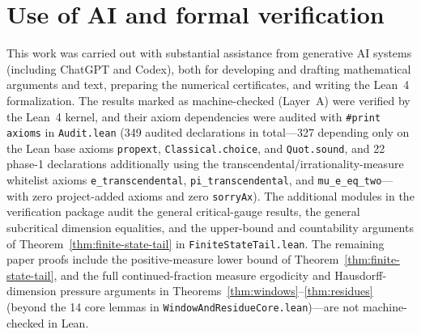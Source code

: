 \documentclass[11pt]{article}
\theoremstyle{definition}
\theoremstyle{remark}
\begin{document}
\section*{Use of AI and formal verification}
This work was carried out with substantial assistance from generative AI
systems (including ChatGPT and Codex), both for developing and drafting
mathematical arguments and text, preparing the numerical certificates, and
writing the Lean~4 formalization. The results marked as machine-checked (Layer~A)
were verified by the Lean~4 kernel, and their axiom dependencies were audited
with \texttt{\#print axioms} in \texttt{Audit.lean} (349 audited declarations
in total---327 depending only on the Lean base axioms \texttt{propext},
\texttt{Classical.choice}, and \texttt{Quot.sound}, and 22 phase-1 declarations
additionally using the transcendental/irrationality-measure whitelist axioms
\texttt{e\_transcendental}, \texttt{pi\_transcendental}, and
\texttt{mu\_e\_eq\_two}---with zero project-added axioms and zero
\texttt{sorryAx}). The additional modules in the verification package audit the general
critical-gauge results, the general subcritical dimension equalities,
and the upper-bound and countability arguments of
Theorem~\ref{thm:finite-state-tail} in \texttt{FiniteStateTail.lean}.
The remaining paper proofs include the positive-measure lower bound of
Theorem~\ref{thm:finite-state-tail}, and
the full continued-fraction measure
ergodicity and Hausdorff-dimension pressure arguments in
Theorems~\ref{thm:windows}--\ref{thm:residues} (beyond the 14 core lemmas in
\texttt{WindowAndResidueCore.lean})---are not machine-checked in Lean.
\end{document}
